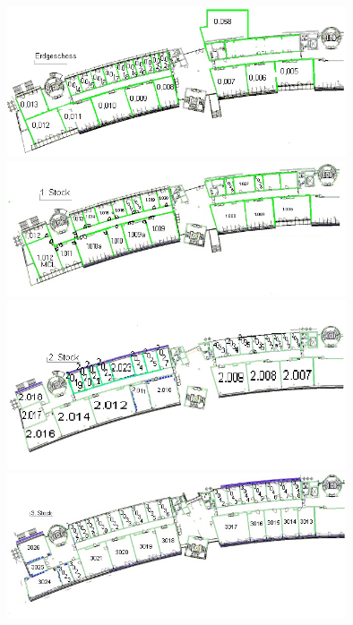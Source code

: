 \includegraphics[width=10cm]{inputs/Lageplan/Erdgeschoss.jpg}\\
\includegraphics[width=10cm]{inputs/Lageplan/ersterstock.jpg}\\
\includegraphics[width=10cm]{inputs/Lageplan/zweiterstock.jpg}\\
\includegraphics[width=10cm]{inputs/Lageplan/dritterstock.jpg}

